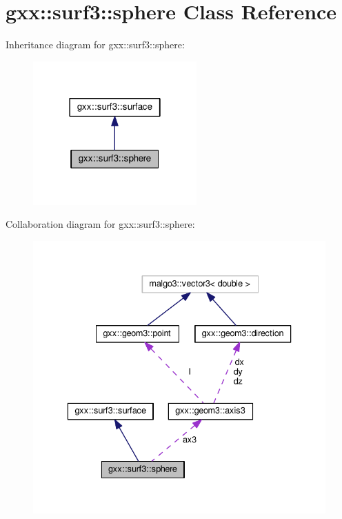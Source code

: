 \hypertarget{classgxx_1_1surf3_1_1sphere}{}\section{gxx\+:\+:surf3\+:\+:sphere Class Reference}
\label{classgxx_1_1surf3_1_1sphere}


Inheritance diagram for gxx\+:\+:surf3\+:\+:sphere\+:
\nopagebreak
\begin{figure}[H]
\begin{center}
\leavevmode
\includegraphics[width=178pt]{classgxx_1_1surf3_1_1sphere__inherit__graph}
\end{center}
\end{figure}


Collaboration diagram for gxx\+:\+:surf3\+:\+:sphere\+:
\nopagebreak
\begin{figure}[H]
\begin{center}
\leavevmode
\includegraphics[width=336pt]{classgxx_1_1surf3_1_1sphere__coll__graph}
\end{center}
\end{figure}
